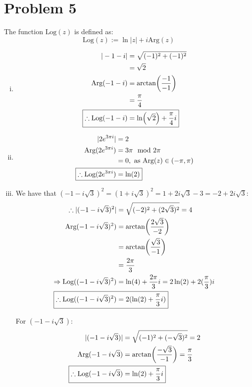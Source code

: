 \documentclass[a4paper, titlepage, DIV=14]{scrartcl}
\newcommand{\Arg}{\text{Arg}}
\newcommand{\Log}{\text{Log}}
\begin{document}
    \section*{Problem 5}
    The function $\Log(z)$ is defined as:
    \begin{equation*}
        \Log(z) := \ln|z| + i\Arg(z)
    \end{equation*}
    \begin{enumerate}[(i)]
        \item \begin{align*}
            |-1-i| &= \sqrt{(-1)^{2} + (-1)^{2}} \\
                &= \sqrt{2} \\
            \Arg(-1-i) &= \arctan(\frac{-1}{-1}) \\ 
                    &= \frac{\pi}{4} \\
            \Aboxed{ \therefore \Log(-1-i) &= \ln(\sqrt{2}) + \frac{\pi}{4}i}
        \end{align*}
        \item \begin{align*}
            |2e^{3\pi i}| &= 2 \\
            \Arg(2e^{3\pi i}) &= 3\pi \mod{2\pi} \\
                            &= 0, \text{ as }\Arg(z) \in (-\pi, \pi) \\
            \Aboxed{ \therefore \Log(2e^{3\pi i}) &= \ln(2) }
        \end{align*}
       
        \item We have that $(-1-i\sqrt{3})^{2} = (1+i\sqrt{3})^{2} = 1 + 2i\sqrt{3} - 3 = -2 + 2i\sqrt{3}$:
        \begin{align*}
            \therefore |(-1-i\sqrt{3})^{2}| &= \sqrt{(-2)^{2}+(2\sqrt{3})^{2}} = 4 \\
            \Arg(-1-i\sqrt{3})^{2}) &= \arctan(\frac{2\sqrt{3}}{-2}) \\
                &= \arctan(\frac{\sqrt{3}}{-1}) \\
                &= \frac{2\pi}{3} \\
            \Rightarrow \Log((-1-i\sqrt{3})^{2}) &= \ln(4) + \frac{2\pi}{3}i = 2\ln(2) + 2(\frac{\pi}{3})i \\
            \Aboxed{\therefore \Log((-1-i\sqrt{3})^{2}) &= 2(\ln(2) + \frac{\pi}{3}i) }
        \end{align*}

        For $(-1-i\sqrt{3})$:
        \begin{align*}
            |(-1-i\sqrt{3})| &= \sqrt{(-1)^{2} + (-\sqrt{3})^{2}} = 2 \\
            \Arg(-1-i\sqrt{3}) &= \arctan(\frac{-\sqrt{3}}{-1}) = \frac{\pi}{3} \\
            \Aboxed{\therefore \Log(-1-i\sqrt{3}) &= \ln(2) + \frac{\pi}{3}i}
        \end{align*}


\end{enumerate}
\end{document}
